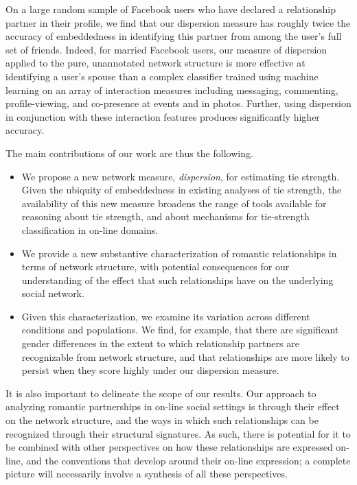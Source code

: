 \documentclass{sigchi}
\begin{document}
On a large random sample of Facebook users who have declared 
a relationship partner in their profile, we find that our 
dispersion measure has roughly twice the accuracy of embeddedness
in identifying this partner from among the user's full
set of friends.
Indeed, for married Facebook users, our measure of dispersion 
applied to the pure, unannotated network structure is more
effective at identifying a user's spouse than a complex classifier
trained using machine learning on an array of interaction measures
including messaging, commenting, profile-viewing, and co-presence 
at events and in photos.
Further, using dispersion in conjunction with these interaction features
produces significantly higher accuracy.

The main contributions of our work are thus the following.
\begin{itemize}
\item We propose a new network measure, {\em dispersion},
for estimating tie strength.  Given the ubiquity of embeddedness
in existing analyses of tie strength, the availability of this new measure
broadens the range of tools available for reasoning about tie strength,
and about mechanisms for tie-strength classification in on-line domains.
\item We provide a new substantive characterization of 
romantic relationships in terms of network structure, 
with potential consequences for our
understanding of the effect that such relationships have
on the underlying social network.
\item Given this characterization, we examine its variation
across different conditions and populations.  We find, for example,
that there are significant gender differences in the extent to which
relationship partners are recognizable from network structure, 
and that relationships are more likely to persist when they score highly
under our dispersion measure.
\end{itemize}

It is also important to delineate the scope of our results.
Our approach to analyzing romantic partnerships in
on-line social settings is through their effect
on the network structure, and the ways in which 
such relationships can be recognized through their structural 
signatures.  As such, there is potential for it to be
combined with other perspectives on how
these relationships are expressed on-line, and the conventions that
develop around their on-line expression; a complete picture will
necessarily involve a synthesis of all these perspectives.
\end{document}
